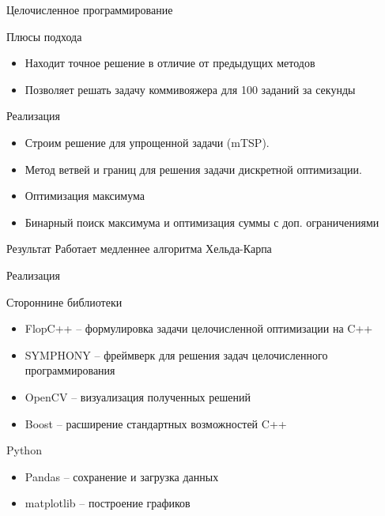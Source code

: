 \documentclass{beamer}
\begin{document}
%
\begin{frame}{Целочисленное программирование}
\begin{block}{Плюсы подхода}
    \begin{itemize}
        \item Находит точное решение в отличие от предыдущих методов
        \item Позволяет решать задачу коммивояжера для 100 заданий за секунды
    \end{itemize}
\end{block}

\begin{block}{Реализация}
    \begin{itemize}
        \item Строим решение для упрощенной задачи (mTSP).
        \item Метод ветвей и границ для решения задачи дискретной оптимизации.
        \item Оптимизация максимума
        \item Бинарный поиск максимума и оптимизация суммы с доп. ограничениями
    \end{itemize}

\end{block}

\begin{alertblock}{Результат}
Работает медленнее алгоритма Хельда-Карпа
\end{alertblock}

\end{frame}

\begin{frame}{Реализация}

Стороннине библиотеки
\begin{itemize}
\item FlopC++ -- формулировка задачи целочисленной оптимизации на C++
\item SYMPHONY -- фреймверк для решения задач целочисленного программирования
\item OpenCV -- визуализация полученных решений
\item Boost -- расширение стандартных возможностей C++
\end{itemize}

Python
\begin{itemize}
\item Pandas -- сохранение и загрузка данных
\item matplotlib -- построение графиков
\end{itemize}

\end{frame}
\end{document}
